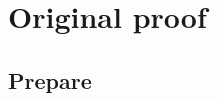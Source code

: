 \documentclass{article}
\newtheorem{lem}[defn]{Lemma}
\newtheorem{thm}[defn]{Theorem}
\begin{document}

\section{Original proof}
\subsection{Prepare}
\end{document}
